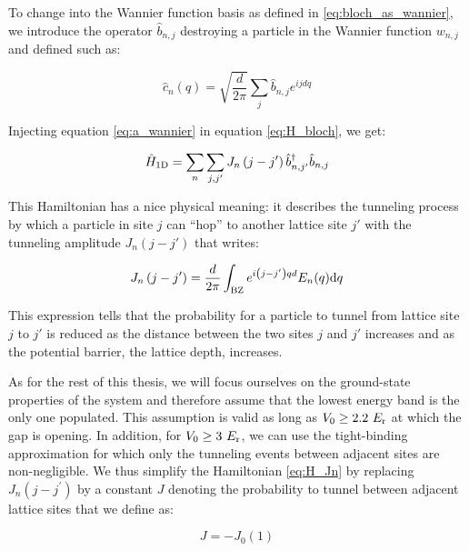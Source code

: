 \noindent To change into the Wannier function basis as defined in \ref{eq:bloch_as_wannier}, we introduce the operator $\hat{b}_{n,j}$ destroying a particle in the Wannier function $w_{n,j}$ and defined such as:

\begin{equation}
    \hat{c}_{n}(q)=\sqrt{\frac{d}{2 \pi}} \sum_{j} \hat{b}_{n, j} e^{i j d q}
    \label{eq:a_wannier}
\end{equation}

\noindent Injecting equation \ref{eq:a_wannier} in equation \ref{eq:H_bloch}, we get:

\begin{equation}
    \hat{H}_{\rm{1D}}=\sum_{n} \sum_{j, j^{\prime}} J_{n}\left(j-j^{\prime}\right) \hat{b}_{n, j^{\prime}}^{\dagger} \hat{b}_{n,j}
    \label{eq:H_Jn}
\end{equation}

\noindent This Hamiltonian has a nice physical meaning: it describes the tunneling process by which a particle in site $j$ can ``hop'' to another lattice site $j'$ with the tunneling amplitude $J_n (j-j')$ that writes:

\begin{equation}
    J_{n}\left(j-j^{\prime}\right)=\frac{d}{2 \pi} \int_{\rm{BZ}} e^{i\left(j-j^{\prime}\right) q d} E_{n}(q) \mathrm{d} q
\end{equation}

\noindent This expression tells that the probability for a particle to tunnel from lattice site $j$ to $j'$ is reduced as the distance between the two sites $j$ and $j'$ increases and as the potential barrier, \ie the lattice depth, increases.

As for the rest of this thesis, we will focus ourselves on the ground-state properties of the system and therefore assume that the lowest energy band is the only one populated. This assumption is valid as long as $V_0 \geq 2.2 \ E_{\rm{r}}$ at which the gap is opening. In addition, for $V_0 \geq 3 \ E_{\rm{r}}$, we can use the tight-binding approximation for which only the tunneling events between adjacent sites are non-negligible. We thus simplify the Hamiltonian \ref{eq:H_Jn} by replacing  $J_{n}\left(j-j^{\prime}\right)$ by a constant $J$ denoting the probability to tunnel between adjacent lattice sites that we define as:

\begin{equation}
    J=-J_0(1)
\end{equation}

